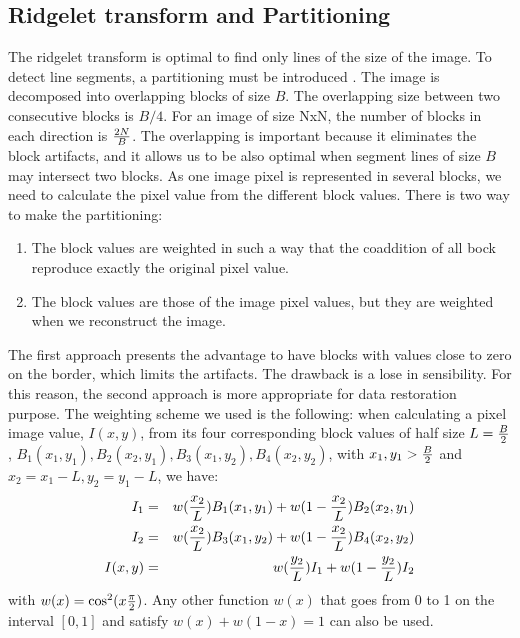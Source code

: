 \documentclass[11pt,a4paper]{article}
\begin{document}
\subsection{Ridgelet transform and Partitioning}
The ridgelet transform is optimal to find only lines of the size 
of the image. To detect line segments, a partitioning must be
introduced \cite{cur:candes98}.  The image is decomposed 
into overlapping blocks
of size $B$. The overlapping size between two consecutive blocks
is $B/4$. For an image of size NxN, the number of blocks 
in each direction is ${2N \over B}$. The overlapping is important
because it eliminates the block artifacts, and it allows us to be 
also optimal when segment lines of size $B$ may 
intersect two blocks. 
As one image pixel is represented in several blocks, we need
to calculate the pixel value from the different block values. 
There is two way to make the partitioning:
\begin{enumerate}
\item The block values are weighted in such a way that the coaddition 
of all bock reproduce exactly the original pixel value.
\item The block values are those of the image pixel values, but they are weighted
when we reconstruct the image.
\end{enumerate}
The first approach presents the advantage to have blocks with values close 
to zero on the border, which limits the artifacts. The drawback is 
a lose in sensibility. For this reason, the second approach 
is more appropriate for data restoration purpose.
The weighting scheme we used is the following: when 
calculating a pixel image value, $I(x,y)$, from its four corresponding block
values of half size $L={B \over 2}$, 
$B_1(x_1,y_1),B_2(x_2,y_1),B_3(x_1,y_2),B_4(x_2,y_2)$, with
$x_1,y_1 > {B \over 2}$ and $x_2 = x_1-L, y_2=y_1-L$, we have:
\begin{eqnarray}
I_1 &  = &  w({x_2\over L}) B_1(x_1,y_1) + w(1-{x_2\over L}) B_2(x_2,y_1)  \nonumber \\
I_2 &  = &  w({x_2\over L}) B_3(x_1,y_2) + w(1-{x_2\over L}) B_4(x_2,y_2)  \nonumber \\
I(x,y) &  = &  w({y_2\over L}) I_1 +  w(1-{y_2\over L}) I_2  \\
\end{eqnarray}
with $w(x) = {\cos}^2( x {\pi \over 2})$.
Any other function $w(x) $ that goes from 0 to 1 on the interval $[0,1]$ and 
satisfy $w(x) + w(1-x) = 1$ can also be used.
\end{document}
